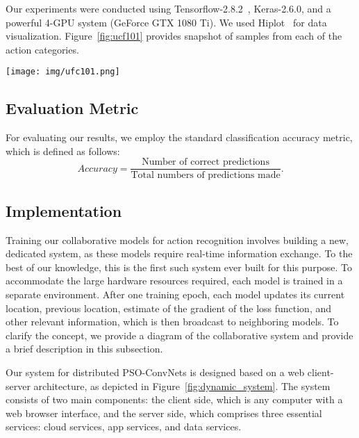 \documentclass[fleqn,10pt]{wlscirep}
\begin{document}
Our experiments were conducted using Tensorflow-2.8.2~\cite{abadi2015tensorflow}, Keras-2.6.0, and a powerful 4-GPU system (GeForce\textsuperscript{\textregistered} GTX 1080 Ti). We used Hiplot~\cite{hiplot} for data visualization. Figure~\ref{fig:ucf101} provides snapshot of samples from each of the action categories.
\begin{figure*}[!htb]
\begin{center}
\texttt{[image: img/ufc101.png]}
\caption{A snapshot of samples of all actions from UCF-101 dataset~\cite{soomro2012ucf101}.}
\label{fig:ucf101}
\end{center}
\end{figure*}







\subsection{Evaluation Metric}
\label{sec:metric}
For evaluating our results, we employ the standard classification accuracy metric, which is defined as follows:
\begin{equation}
Accuracy=\frac{\mbox{Number of correct predictions}}{\mbox{Total numbers of predictions made}}.
\end{equation}
\subsection{Implementation}
\label{sec:implementation}


Training our collaborative models for action recognition involves building a new, dedicated system, as these models require real-time information exchange. To the best of our knowledge, this is the first such system ever built for this purpose. To accommodate the large hardware resources required, each model is trained in a separate environment. After one training epoch, each model updates its current location, previous location, estimate of the gradient of the loss function, and other relevant information, which is then broadcast to neighboring models. To clarify the concept, we provide a diagram of the collaborative system and provide a brief description in this subsection.





Our system for distributed PSO-ConvNets is designed based on a web client-server architecture, as depicted in Figure~\ref{fig:dynamic_system}. The system consists of two main components: the client side, which is any computer with a web browser interface, and the server side, which comprises three essential services: cloud services, app services, and data services.
\end{document}
